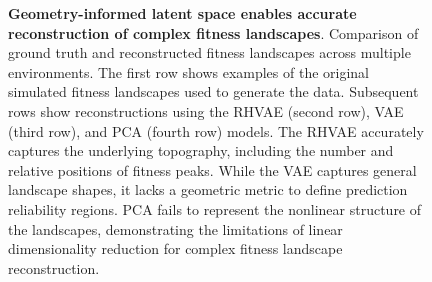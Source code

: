 \documentclass[
]{scrartcl}
\begin{document}
\begin{refsection}
\begin{figure}
\caption{\label{fig-05-kimura}\textbf{Geometry-informed latent space
enables accurate reconstruction of complex fitness landscapes}.
Comparison of ground truth and reconstructed fitness landscapes across
multiple environments. The first row shows examples of the original
simulated fitness landscapes used to generate the data. Subsequent rows
show reconstructions using the RHVAE (second row), VAE (third row), and
PCA (fourth row) models. The RHVAE accurately captures the underlying
topography, including the number and relative positions of fitness
peaks. While the VAE captures general landscape shapes, it lacks a
geometric metric to define prediction reliability regions. PCA fails to
represent the nonlinear structure of the landscapes, demonstrating the
limitations of linear dimensionality reduction for complex fitness
landscape reconstruction.}

\end{figure}%

\printbibliography[title={Reference},
section=\therefsection]
\end{refsection}
\end{document}
